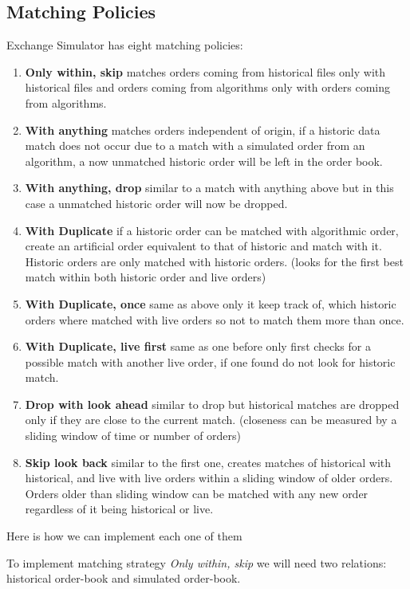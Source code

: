 \documentclass{article}
\begin{document}
\subsection{Matching Policies}

Exchange Simulator has eight matching policies:

\begin{enumerate}
    \item {\bf Only within, skip} matches orders coming from historical files only with historical files and orders coming from algorithms only with orders coming from algorithms.
    \item{\bf With anything} matches orders independent of origin, if a historic data match does not occur due to a match with a simulated order from an algorithm, a now unmatched historic order will be left in the order book. 
    \item{\bf With anything, drop} similar to a match with anything above but in this case a unmatched historic order will now be dropped. 
    \item{\bf With Duplicate} if a historic order can be matched with algorithmic order, create an artificial order equivalent to that of historic and match with it. Historic orders are only matched with historic orders. (looks for the first best match within both historic order and live orders)
    \item{\bf With Duplicate, once} same as above only it keep track of, which historic orders where matched with live orders so not to match them more than once. 
    \item{\bf With Duplicate, live first} same as one before only first checks for a possible match with another live order, if one found do not look for historic match. 
    \item{\bf Drop with look ahead} similar to drop but historical matches are dropped only if they are close to the current match. (closeness can be measured by a sliding window of time or number of orders)
    \item{\bf Skip look back} similar to the first one, creates matches of historical with historical, and live with live orders within a sliding window of older orders. Orders older than sliding window can be matched with any new order regardless of it being historical or live.
\end{enumerate}

\noindent Here is how we can implement each one of them

To implement matching strategy \emph{Only within, skip} we will need two relations: historical order-book and simulated order-book.
\end{document}
